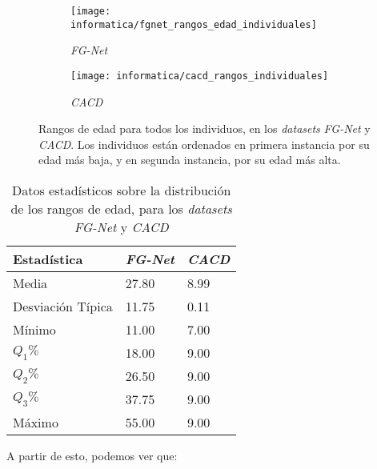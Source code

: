 \begin{figure}[H]
\centering
    \begin{subfigure}{.5\textwidth}
        \centering
        \texttt{[image: informatica/fgnet\_rangos\_edad\_individuales]}
        \caption{\textit{FG-Net}}
    \end{subfigure}%
    \begin{subfigure}{.5\textwidth}
        \centering
        \texttt{[image: informatica/cacd\_rangos\_individuales]}
        \caption{\textit{CACD}}
    \end{subfigure}
\caption{Rangos de edad para todos los individuos, en los \textit{datasets} \textit{FG-Net} y \textit{CACD}. Los individuos están ordenados en primera instancia por su edad más baja, y en segunda instancia, por su edad más alta.}
\label{img:conjunta_fgnet_rangos_edades_individuales}
\end{figure}

\begin{table}[H]
\centering
\begin{tabular}{|l|l|l|}
    \hline
    \textbf{Estadística} & \textbf{\textit{FG-Net}} & \textbf{\textit{CACD}} \\
    \hline

    Media             & 27.80 & 8.99 \\
    Desviación Típica & 11.75 & 0.11 \\
    Mínimo            & 11.00 & 7.00 \\
    $Q_1 \%$          & 18.00 & 9.00 \\
    $Q_2 \%$          & 26.50 & 9.00 \\
    $Q_3 \%$          & 37.75 & 9.00 \\
    Máximo            & 55.00 & 9.00 \\

    \hline

\end{tabular}
\caption{Datos estadísticos sobre la distribución de los rangos de edad, para los \textit{datasets} \textit{FG-Net} y \textit{CACD}}
    \label{table:conjunta_fgnet_estadisticas_rangos_edad}
\end{table}

A partir de esto, podemos ver que:


